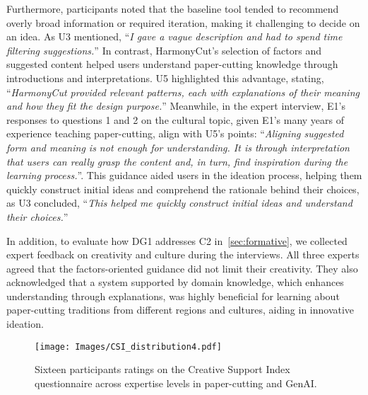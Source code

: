 Furthermore, participants noted that the baseline tool tended to recommend overly broad information or required iteration, making it challenging to decide on an idea. As U3 mentioned, ``\textit{I gave a vague description and had to spend time filtering suggestions.}'' In contrast, HarmonyCut's selection of factors and suggested content helped users understand paper-cutting knowledge through introductions and interpretations. U5 highlighted this advantage, stating, ``\textit{HarmonyCut provided relevant patterns, each with explanations of their meaning and how they fit the design purpose.}''  Meanwhile, in the expert interview, E1’s responses to questions 1 and 2 on the cultural topic, given E1's many years of experience teaching paper-cutting, align with U5’s points: ``\textit{Aligning suggested form and meaning is not enough for understanding. It is through interpretation that users can really grasp the content and, in turn, find inspiration during the learning process.}''. This guidance aided users in the ideation process, helping them quickly construct initial ideas and comprehend the rationale behind their choices, as U3 concluded, ``\textit{This helped me quickly construct initial ideas and understand their choices.}''

In addition, to evaluate how DG1 addresses C2 in~\autoref{sec:formative}, we collected expert feedback on creativity and culture during the interviews. All three experts agreed that the factors-oriented guidance did not limit their creativity. They also acknowledged that a system supported by domain knowledge, which enhances understanding through explanations, was highly beneficial for learning about paper-cutting traditions from different regions and cultures, aiding in innovative ideation.

\begin{figure*}[!htbp]
\centering
\texttt{[image: Images/CSI\_distribution4.pdf]}
\caption{\label{figure:CSI}
Sixteen participants ratings on the Creative Support Index questionnaire across expertise levels in paper-cutting and GenAI.}
\end{figure*}


